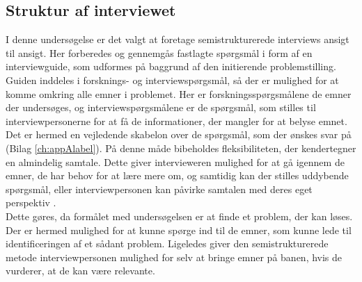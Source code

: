 \subsection {Struktur af interviewet}
I denne undersøgelse er det valgt at foretage semistrukturerede interviews ansigt til ansigt. Her forberedes og gennemgås fastlagte spørgsmål i form af en interviewguide, som udformes på baggrund af den initierende problemstilling. Guiden inddeles i forsknings- og interviewspørgsmål, så der er mulighed for at komme omkring alle emner i problemet. Her er forskningsspørgsmålene de emner der undersøges, og interviewspørgsmålene er de spørgsmål, som stilles til interviewpersonerne for at få de informationer, der mangler for at belyse emnet. Det er hermed en vejledende skabelon over de spørgsmål, som der ønskes svar på (Bilag \ref{ch:appAlabel}). På denne måde bibeholdes fleksibiliteten, der kendertegner en almindelig samtale. Dette giver intervieweren mulighed for at gå igennem de emner, de har behov for at lære mere om, og samtidig kan der stilles uddybende spørgsmål, eller interviewpersonen kan påvirke samtalen med deres eget perspektiv \citep{brinkmann2014}\citep{kvale2015}.\\
Dette gøres, da formålet med undersøgelsen er at finde et problem, der kan løses. Der er hermed mulighed for at kunne spørge ind til de emner, som kunne lede til identificeringen af et sådant problem. Ligeledes giver den semistrukturerede metode interviewpersonen mulighed for selv at bringe emner på banen, hvis de vurderer, at de kan være relevante.

